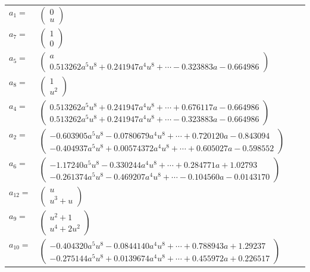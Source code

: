 \documentclass[1p]{elsarticle_modified}
\theoremstyle{definition}
\begin{document}
\begin{tabular}{m{7pt} m{180pt} m{7pt} m{180pt} }
\flushright $a_{1}=$&$\begin{pmatrix}0\\u\end{pmatrix}$ \\
\flushright $a_{7}=$&$\begin{pmatrix}1\\0\end{pmatrix}$ \\
\flushright $a_{5}=$&$\begin{pmatrix}a\\0.513262 a^{5} u^{8}+0.241947 a^{4} u^{8}+\cdots-0.323883 a-0.664986\end{pmatrix}$ \\
\flushright $a_{8}=$&$\begin{pmatrix}1\\u^2\end{pmatrix}$ \\
\flushright $a_{4}=$&$\begin{pmatrix}0.513262 a^{5} u^{8}+0.241947 a^{4} u^{8}+\cdots+0.676117 a-0.664986\\0.513262 a^{5} u^{8}+0.241947 a^{4} u^{8}+\cdots-0.323883 a-0.664986\end{pmatrix}$ \\
\flushright $a_{2}=$&$\begin{pmatrix}-0.603905 a^{5} u^{8}-0.0780679 a^{4} u^{8}+\cdots+0.720120 a-0.843094\\-0.404937 a^{5} u^{8}+0.00574372 a^{4} u^{8}+\cdots+0.605027 a-0.598552\end{pmatrix}$ \\
\flushright $a_{6}=$&$\begin{pmatrix}-1.17240 a^{5} u^{8}-0.330244 a^{4} u^{8}+\cdots+0.284771 a+1.02793\\-0.261374 a^{5} u^{8}-0.469207 a^{4} u^{8}+\cdots-0.104560 a-0.0143170\end{pmatrix}$ \\
\flushright $a_{12}=$&$\begin{pmatrix}u\\u^3+u\end{pmatrix}$ \\
\flushright $a_{9}=$&$\begin{pmatrix}u^2+1\\u^4+2 u^2\end{pmatrix}$ \\
\flushright $a_{10}=$&$\begin{pmatrix}-0.404320 a^{5} u^{8}-0.0844140 a^{4} u^{8}+\cdots+0.788943 a+1.29237\\-0.275144 a^{5} u^{8}+0.0139674 a^{4} u^{8}+\cdots+0.455972 a+0.226517\end{pmatrix}$ \\

\end{tabular}
\end{document}
